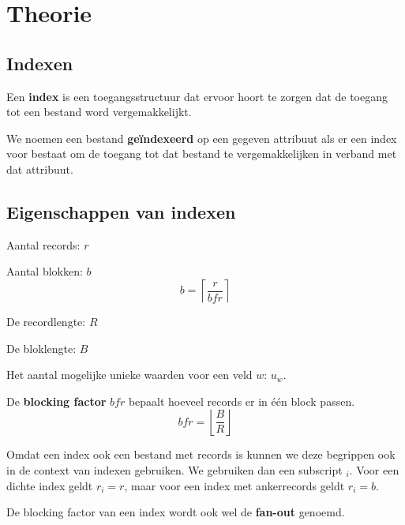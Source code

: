 \documentclass[indexstructuren.tex]{subfiles}
\begin{document}
\chapter{Theorie}
\section{Indexen}
\begin{de}
Een \textbf{index} is een toegangsstructuur dat ervoor hoort te zorgen dat de toegang tot een bestand word vergemakkelijkt.
\end{de}
\begin{de}
We noemen een bestand \textbf{ge\"indexeerd} op een gegeven attribuut als er een index voor bestaat om de toegang tot dat bestand te vergemakkelijken in verband met dat attribuut.
\end{de}

\section{Eigenschappen van indexen}
\begin{de}
Aantal records: $r$
\end{de}

\begin{de}
Aantal blokken: $b$
\[
b = \left\lceil \frac{r}{bfr} \right\rceil
\]
\end{de}

\begin{de}
De recordlengte: $R$
\end{de}

\begin{de}
De bloklengte: $B$
\end{de}

\begin{de}
Het aantal mogelijke unieke waarden voor een veld $w$: $u_w$.
\end{de}

\begin{de}
De \textbf{blocking factor} $bfr$ bepaalt hoeveel records er in \'e\'en block passen.
\[
bfr = \left\lfloor \frac{B}{R} \right\rfloor
\]
\end{de}
Omdat een index ook een bestand met records is kunnen we deze begrippen ook in de context van indexen gebruiken. We gebruiken dan een subscript $_i$.
Voor een dichte index geldt $r_i = r$, maar voor een index met ankerrecords geldt $r_i = b$.
\begin{de}
De blocking factor van een index wordt ook wel de \textbf{fan-out} genoemd.
\end{de}
\end{document}

